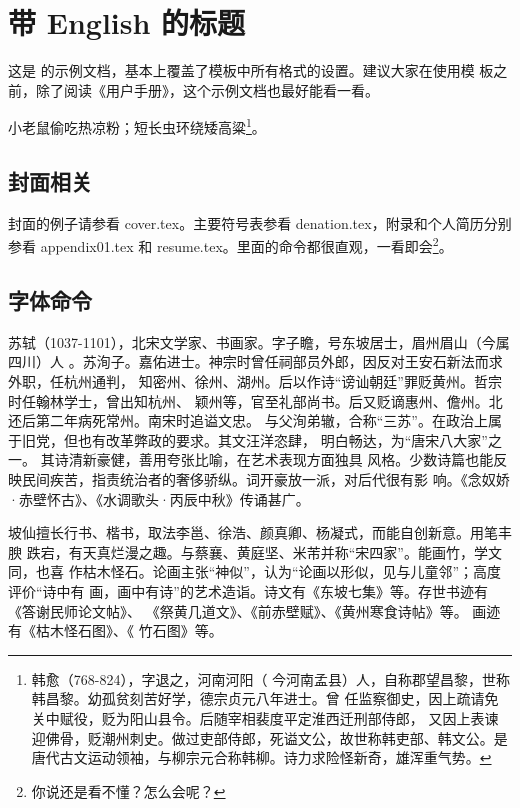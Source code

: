 \chapter{带 English 的标题}

这是 \thuthesis{} 的示例文档，基本上覆盖了模板中所有格式的设置。建议大家在使用模
板之前，除了阅读《\thuthesis{}用户手册》，这个示例文档也最好能看一看。

小老鼠偷吃热凉粉；短长虫环绕矮高粱\footnote{韩愈（768-824），字退之，河南河阳（
  今河南孟县）人，自称郡望昌黎，世称韩昌黎。幼孤贫刻苦好学，德宗贞元八年进士。曾
  任监察御史，因上疏请免关中赋役，贬为阳山县令。后随宰相裴度平定淮西迁刑部侍郎，
  又因上表谏迎佛骨，贬潮州刺史。做过吏部侍郎，死谥文公，故世称韩吏部、韩文公。是
  唐代古文运动领袖，与柳宗元合称韩柳。诗力求险怪新奇，雄浑重气势。}。


\section{封面相关}
封面的例子请参看 cover.tex。主要符号表参看 denation.tex，附录和个人简历分别参看 appendix01.tex
和 resume.tex。里面的命令都很直观，一看即会\footnote{你说还是看不懂？怎么会呢？}。

\section{字体命令}
\label{sec:first}

苏轼（1037-1101），北宋文学家、书画家。字子瞻，号东坡居士，眉州眉山（今属四川）人
。苏洵子。嘉佑进士。神宗时曾任祠部员外郎，因反对王安石新法而求外职，任杭州通判，
知密州、徐州、湖州。后以作诗“谤讪朝廷”罪贬黄州。哲宗时任翰林学士，曾出知杭州、
颖州等，官至礼部尚书。后又贬谪惠州、儋州。北还后第二年病死常州。南宋时追谥文忠。
与父洵弟辙，合称“三苏”。在政治上属于旧党，但也有改革弊政的要求。其文汪洋恣肆，
明白畅达，为“唐宋八大家”之一。  其诗清新豪健，善用夸张比喻，在艺术表现方面独具
风格。少数诗篇也能反映民间疾苦，指责统治者的奢侈骄纵。词开豪放一派，对后代很有影
响。《念奴娇·赤壁怀古》、《水调歌头·丙辰中秋》传诵甚广。

{\kaishu 坡仙擅长行书、楷书，取法李邕、徐浩、颜真卿、杨凝式，而能自创新意。用笔丰腴
  跌宕，有天真烂漫之趣。与蔡襄、黄庭坚、米芾并称“宋四家”。能画竹，学文同，也喜
  作枯木怪石。论画主张“神似”，认为“论画以形似，见与儿童邻”；高度评价“诗中有
  画，画中有诗”的艺术造诣。诗文有《东坡七集》等。存世书迹有《答谢民师论文帖》、
  《祭黄几道文》、《前赤壁赋》、《黄州寒食诗帖》等。  画迹有《枯木怪石图》、《
  竹石图》等。}

